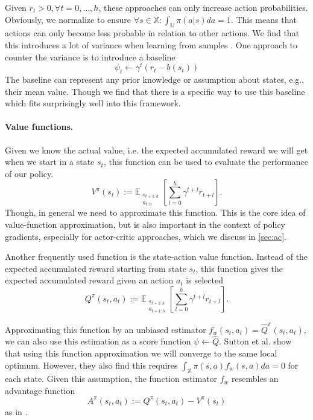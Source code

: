 Given $r_t > 0, \forall t=0,\dots,h$, these approaches can only increase action probabilities. Obviously, we normalize to ensure $\forall s \in \mathbb{X}: \int_\mathbb{U}{\pi(a|s)da} = 1$. This means that actions can only become less probable in relation to other actions. We find that this introduces a lot of variance when learning from samples \cite{Sutton:1999:PGM:3009657.3009806}. One approach to counter the variance is to introduce a baseline
\begin{equation}
  \psi_t \leftarrow \gamma^{t} (r_{t} - b(s_t))
\end{equation}
The baseline can represent any prior knowledge or assumption about states, e.g., their mean value. Though we find that there is a specific way to use this baseline which fits surprisingly well into this framework.

\paragraph{Value functions.} Given we know the actual value, i.e. the expected accumulated reward we will get when we start in a state $s_t$, this function can be used to evaluate the performance of our policy.
\begin{equation}
	V^{\pi}(s_t) := \mathbb{E}_{\substack{s_{t+1:h} \\ a_{t:h}}}\left[\sum_{l=0}^{h} \gamma^{t+l} r_{t+l}\right].
	\label{eqn:v}
\end{equation}
Though, in general we need to approximate this function. This is the core idea of value-function approximation, but is also important in the context of policy gradients, especially for actor-critic approaches, which we discuss in \ref{sec:ac}. 

Another frequently used function is the state-action value function. Instead of the expected accumulated reward starting from state $s_t$, this function gives the expected accumulated reward given an action $a_t$ is selected
\begin{equation}
	Q^{\pi}(s_t, a_t) := \mathbb{E}_{\substack{s_{t+1:h} \\ a_{t+1:h}}}\left[\sum_{l=0}^{h} \gamma^{t+l} r_{t+l}\right].
	\label{eqn:q}
\end{equation}

Approximating this function by an unbiased estimator $f_w(s_t, a_t) = \hat{Q}^\pi(s_t, a_t)$, we can also use this estimation as a score function $\psi \leftarrow \hat{Q}$. Sutton et al. \cite{Sutton:1999:PGM:3009657.3009806} show that using this function approximation we will converge to the same local optimum. However, they also find this requires $\int_\mathbb{X}{\pi(s,a)f_w(s,a)da} = 0$ for each state. Given this assumption, the function estimator $f_w$ resembles an advantage function
\begin{equation}
	A^{\pi}(s_t, a_t) := Q^{\pi}(s_t, a_t) - V^{\pi}(s_t)
	\label{eqn:adv}
\end{equation}
as in \cite{1993b}.

